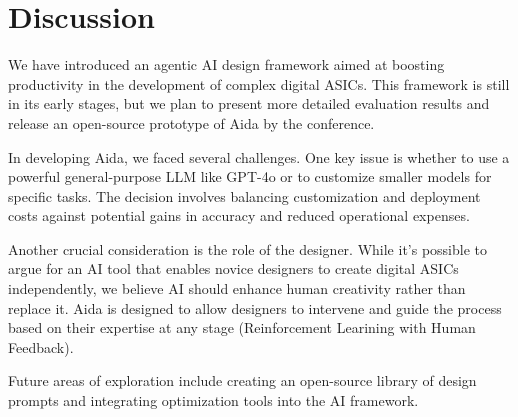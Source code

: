 \section{Discussion}
\label{sec:discussion}
We have introduced an agentic AI design framework aimed at boosting productivity in the development of complex digital ASICs. This framework is still in its early stages, but we plan to present more detailed evaluation results and release an open-source prototype of Aida by the conference.

In developing Aida, we faced several challenges. One key issue is whether to use a powerful general-purpose LLM like GPT-4o or to customize smaller models for specific tasks. The decision involves balancing customization and deployment costs against potential gains in accuracy and reduced operational expenses.

Another crucial consideration is the role of the designer. While it's possible to argue for an AI tool that enables novice designers to create digital ASICs independently, we believe AI should enhance human creativity rather than replace it. Aida is designed to allow designers to intervene and guide the process based on their expertise at any stage (Reinforcement Learining with Human Feedback). 

Future areas of exploration include creating an open-source library of design prompts and integrating optimization tools into the AI framework.